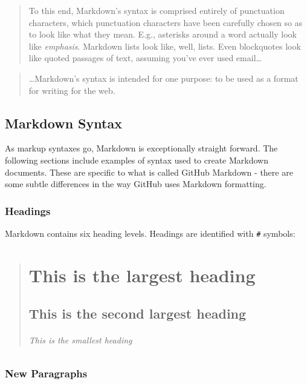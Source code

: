 \documentclass[]{book}
\let\oldsubparagraph\subparagraph
\renewcommand{\subparagraph}[1]{\oldsubparagraph{#1}\mbox{}}
\begin{document}
\begin{quote}
To this end, Markdown's syntax is comprised entirely of punctuation
characters, which punctuation characters have been carefully chosen so
as to look like what they mean. E.g., asterisks around a word actually
look like \emph{emphasis}. Markdown lists look like, well, lists. Even
blockquotes look like quoted passages of text, assuming you've ever used
email\ldots{}
\end{quote}

\begin{quote}
\ldots{}Markdown's syntax is intended for one purpose: to be used as a
format for writing for the web.
\end{quote}

\section{Markdown Syntax}\label{markdown-syntax}

As markup syntaxes go, Markdown is exceptionally straight forward. The
following sections include examples of syntax used to create Markdown
documents. These are specific to what is called GitHub Markdown - there
are some subtle differences in the way GitHub uses Markdown formatting.

\subsection{Headings}\label{headings}

Markdown contains six heading levels. Headings are identified with
\texttt{\#} symbols:

\begin{quote}
\chapter{This is the largest heading}\label{this-is-the-largest-heading}

\section{This is the second largest
heading}\label{this-is-the-second-largest-heading}

\mbox{}%
\subparagraph{This is the smallest
heading}\label{this-is-the-smallest-heading}
\end{quote}

\subsection{New Paragraphs}\label{new-paragraphs}
\end{document}
